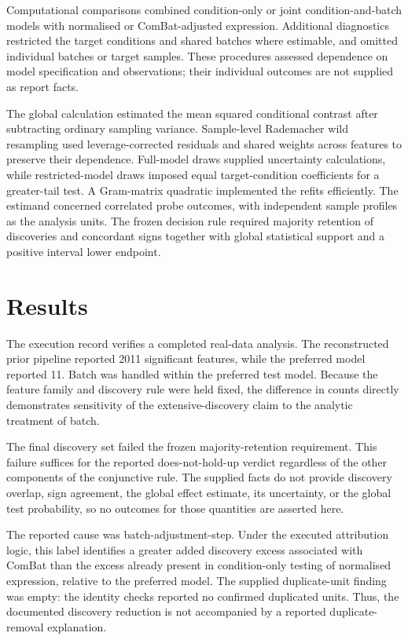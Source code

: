 \documentclass[10pt,a4paper]{article}
\begin{document}
\par
Computational comparisons combined condition-only or joint condition-and-batch models with normalised or ComBat-adjusted expression. Additional diagnostics restricted the target conditions and shared batches where estimable, and omitted individual batches or target samples. These procedures assessed dependence on model specification and observations; their individual outcomes are not supplied as report facts.
\par
The global calculation estimated the mean squared conditional contrast after subtracting ordinary sampling variance. Sample-level Rademacher wild resampling used leverage-corrected residuals and shared weights across features to preserve their dependence. Full-model draws supplied uncertainty calculations, while restricted-model draws imposed equal target-condition coefficients for a greater-tail test. A Gram-matrix quadratic implemented the refits efficiently. The estimand concerned correlated probe outcomes, with independent sample profiles as the analysis units. The frozen decision rule required majority retention of discoveries and concordant signs together with global statistical support and a positive interval lower endpoint.
\par
\section*{Results}
The execution record verifies a completed real-data analysis. The reconstructed prior pipeline reported 2011 significant features, while the preferred model reported 11. Batch was handled within the preferred test model. Because the feature family and discovery rule were held fixed, the difference in counts directly demonstrates sensitivity of the extensive-discovery claim to the analytic treatment of batch.
\par
The final discovery set failed the frozen majority-retention requirement. This failure suffices for the reported does-not-hold-up verdict regardless of the other components of the conjunctive rule. The supplied facts do not provide discovery overlap, sign agreement, the global effect estimate, its uncertainty, or the global test probability, so no outcomes for those quantities are asserted here.
\par
The reported cause was batch-adjustment-step. Under the executed attribution logic, this label identifies a greater added discovery excess associated with ComBat than the excess already present in condition-only testing of normalised expression, relative to the preferred model. The supplied duplicate-unit finding was empty: the identity checks reported no confirmed duplicated units. Thus, the documented discovery reduction is not accompanied by a reported duplicate-removal explanation.
\par
\end{document}
